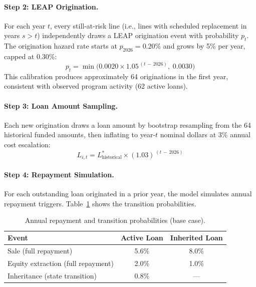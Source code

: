 \documentclass[11pt, letterpaper]{article}
\begin{document}
\paragraph{Step 2: LEAP Origination.} For each year $t$, every still-at-risk line (i.e., lines with scheduled replacement in years $s > t$) independently draws a LEAP origination event with probability $p_t$. The origination hazard rate starts at $p_{2026} = 0.20\%$ and grows by 5\% per year, capped at 0.30\%:
\begin{equation}
  p_t = \min\!\Big(0.0020 \times 1.05^{\,(t\,-\,2026)},\; 0.0030\Big)
\end{equation}
This calibration produces approximately 64 originations in the first year, consistent with observed program activity (62 active loans).

\paragraph{Step 3: Loan Amount Sampling.} Each new origination draws a loan amount by bootstrap resampling from the 64 historical funded amounts, then inflating to year-$t$ nominal dollars at 3\% annual cost escalation:
\begin{equation}
  L_{i,t} = L_{\text{historical}}^{*} \times (1.03)^{\,(t\,-\,2026)}
\end{equation}

\paragraph{Step 4: Repayment Simulation.} For each outstanding loan originated in a prior year, the model simulates annual repayment triggers. Table~\ref{tab:transition_probs} shows the transition probabilities.

\begin{table}[H]
  \centering
  \caption{Annual repayment and transition probabilities (base case).}
  \label{tab:transition_probs}
  \begin{tabular}{@{}lcc@{}}
    \toprule
    \textbf{Event} & \textbf{Active Loan} & \textbf{Inherited Loan} \\
    \midrule
    Sale (full repayment) & 5.6\% & 8.0\% \\
    Equity extraction (full repayment) & 2.0\% & 1.0\% \\
    Inheritance (state transition) & 0.8\% & --- \\
    \bottomrule
  \end{tabular}
\end{table}
\end{document}
